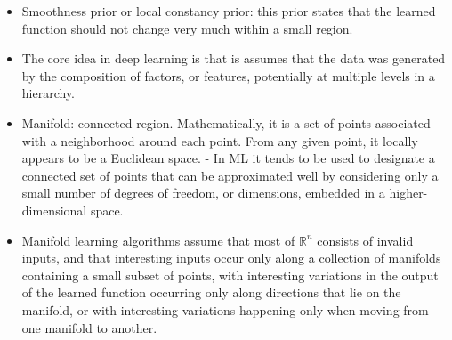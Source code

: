 \documentclass{article}
\begin{document}
\begin{itemize}
\item Smoothness prior or local constancy prior: this prior states that the learned function should not change very much within a small region.
\item The core idea in deep learning is that is assumes that the data was generated by the composition of factors, or features, potentially at multiple levels in a hierarchy.
\item Manifold: connected region. Mathematically, it is a set of points associated with a neighborhood around each point. From any given point, it locally appears to be a Euclidean space. - In ML it tends to be used to designate a connected set of points that can be approximated well by considering only a small number of degrees of freedom, or dimensions, embedded in a higher-dimensional space.
\item Manifold learning algorithms assume that most of \(\mathbb{R}^n\) consists of invalid inputs, and that interesting inputs occur only along a collection of manifolds containing a small subset of points, with interesting variations in the output of the learned function occurring only along directions that lie on the manifold, or with interesting variations happening only when moving from one manifold to another.
\end{itemize}
\end{document}
